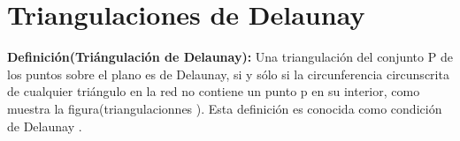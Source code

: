 \documentclass[12pt]{report}
\begin{document}

\section{Triangulaciones de Delaunay}
\textbf{Definición(Triángulación de Delaunay):} Una triangulación del conjunto P de los puntos sobre el plano es de Delaunay, si y sólo si la circunferencia circunscrita de cualquier triángulo en la red no contiene un punto p en su interior, como muestra la figura(triangulacionnes ). Esta definición es conocida como condición de Delaunay \cite{26,27,28}.\\    
\end{document}
